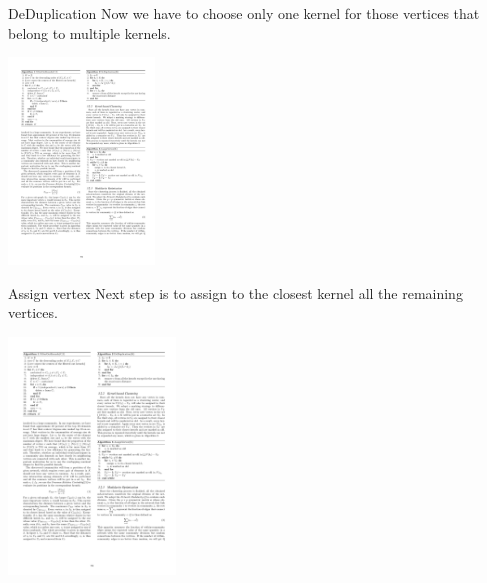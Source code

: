


 

\begin{frame}{DeDuplication}
\vskip 0.8cm
Now we have to choose only one kernel for those vertices that belong to multiple kernels.
\begin{center}
	\includegraphics[height=5.5cm]{images/deduplication.pdf}
\end{center}
\end{frame}

\begin{frame}{Assign vertex}
\vskip 0.9cm
Next step is to assign to the closest kernel all the remaining vertices.
\begin{center}
	\includegraphics[height=6.3cm]{images/assignVertices.pdf}
\end{center}
\end{frame}

